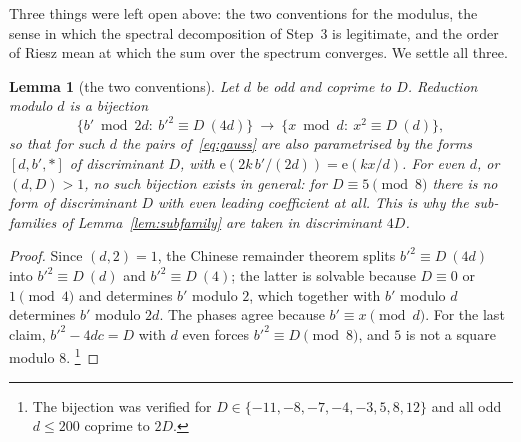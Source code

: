 \documentclass[11pt,a4paper]{article}
\newtheorem{lemma}[theorem]{Lemma}
\theoremstyle{remark}\newtheorem{remark}[theorem]{Remark}
\newcommand{\e}{\mathrm e}\newcommand{\Off}{\mathrm{Off}}\newcommand{\rep}[2]{\langle #1\rangle_{#2}}
\begin{document}
Three things were left open above: the two conventions for the modulus, the sense in which the spectral
decomposition of Step~3 is legitimate, and the order of Riesz mean at which the sum over the spectrum converges. We
settle all three.

\begin{lemma}[the two conventions]\label{lem:conventions}
Let $d$ be odd and coprime to $D$. Reduction modulo $d$ is a bijection
\[
\{b'\bmod2d:\ b'^2\equiv D\ (4d)\}\ \longrightarrow\ \{x\bmod d:\ x^2\equiv D\ (d)\},
\]
so that for such $d$ the pairs of~\eqref{eq:gauss} are also parametrised by the forms $[d,b',\ast]$ of discriminant
$D$, with $\e(2k\,b'/(2d))=\e(kx/d)$. For even $d$, or $(d,D)>1$, no such bijection exists in general: for
$D\equiv5\pmod8$ there is no form of discriminant $D$ with even leading coefficient at all. This is why the
sub-families of Lemma~\ref{lem:subfamily} are taken in discriminant $4D$.
\end{lemma}
\begin{proof}
Since $(d,2)=1$, the Chinese remainder theorem splits $b'^2\equiv D\ (4d)$ into $b'^2\equiv D\ (d)$ and
$b'^2\equiv D\ (4)$; the latter is solvable because $D\equiv0$ or $1\pmod4$ and determines $b'$ modulo $2$, which
together with $b'$ modulo $d$ determines $b'$ modulo $2d$. The phases agree because $b'\equiv x\pmod d$. For the last
claim, $b'^2-4dc=D$ with $d$ even forces $b'^2\equiv D\pmod8$, and $5$ is not a square modulo $8$. \footnote{The
bijection was verified for $D\in\{-11,-8,-7,-4,-3,5,8,12\}$ and all odd $d\le200$ coprime to $2D$.}
\end{proof}
\end{document}
